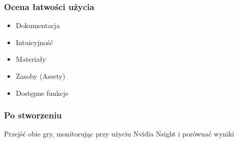       \begin{frame} 
        \frametitle{Ocena łatwości użycia}
        \begin{itemize}
          \item Dokumentacja
          \item Intuicyjność
          \item Materiały 
          \item Zasoby (Assety)  
          \item Dostępne funkcje
        \end{itemize}
      \end{frame}



      \begin{frame} 
        \frametitle{Po stworzeniu}
        Przejść obie gry, monitorując przy użyciu Nvidia Nsight i porównać wyniki
      \end{frame}


